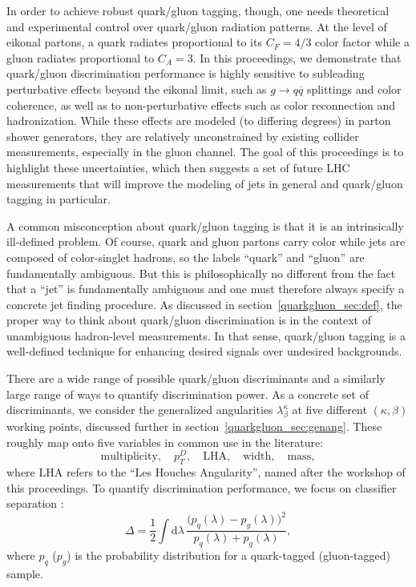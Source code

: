 \documentclass[11pt]{cernrep}
\begin{document}
In order to achieve robust quark/gluon tagging, though, one needs theoretical and experimental control over quark/gluon radiation patterns.  At the level of eikonal partons, a quark radiates proportional to its $C_F = 4/3$ color factor while a gluon radiates proportional to $C_A = 3$.  In this proceedings, we demonstrate that quark/gluon discrimination performance is highly sensitive to subleading perturbative effects beyond the eikonal limit, such as $g \to q \overline{q}$ splittings and color coherence, as well as to non-perturbative effects such as color reconnection and hadronization.   While these effects are modeled (to differing degrees) in parton shower generators, they are relatively unconstrained by existing collider measurements, especially in the gluon channel.  The goal of this proceedings is to highlight these uncertainties, which then suggests a set of future LHC measurements that will improve the modeling of jets in general and quark/gluon tagging in particular.

A common misconception about quark/gluon tagging is that it is an intrinsically ill-defined problem.  Of course, quark and gluon partons carry color while jets are composed of color-singlet hadrons, so the labels ``quark'' and ``gluon'' are fundamentally ambiguous.  But this is philosophically no different from the fact that a ``jet'' is fundamentally ambiguous and one must therefore always specify a concrete jet finding procedure.  As discussed in section~\ref{quarkgluon_sec:def}, the proper way to think about quark/gluon discrimination is in the context of unambiguous hadron-level measurements.  In that sense, quark/gluon tagging is a well-defined technique for enhancing desired signals over undesired backgrounds.

There are a wide range of possible quark/gluon discriminants and a similarly large range of ways to quantify discrimination power.  As a concrete set of discriminants, we consider the generalized angularities $\lambda_\beta^\kappa$ \cite{} at five different $(\kappa, \beta)$ working points, discussed further in section~\ref{quarkgluon_sec:genang}.  These roughly map onto five variables in common use in the literature:
\begin{equation}
\text{multiplicity}, \quad p_T^D, \quad \text{LHA}, \quad \text{width}, \quad \text{mass},
\end{equation}
where LHA refers to the ``Les Houches Angularity'', named after the workshop of this proceedings.  To quantify discrimination performance, we focus on classifier separation \cite{}:
\begin{equation}
\Delta =  \frac{1}{2} \int \text{d} \lambda \, \frac{\bigl(p_q(\lambda) - p_g(\lambda)\bigr)^2}{p_q(\lambda) + p_g(\lambda)},
\end{equation}
where $p_q$ ($p_g$) is the probability distribution for a quark-tagged (gluon-tagged) sample.
\end{document}
